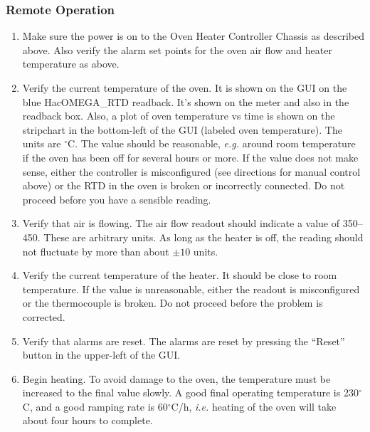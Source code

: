 {\subsubsection{Remote Operation}
\begin{enumerate}
\item Make sure the power is on to the Oven Heater Controller
Chassis as described above.  Also verify the alarm set points
for the oven air flow and heater temperature as above.  
\item Verify the current temperature of the oven.  It is shown
on the GUI on the blue HacOMEGA\_RTD readback.  It's shown on 
the meter and also in the readback box.  Also, a plot of oven temperature
vs time is shown on the stripchart in the bottom-left of the GUI 
(labeled oven temperature).  The units are $^\circ$C. 
The value should be reasonable,  {\it e.g.}\/ around room temperature 
if the oven has been off for several hours or more. If the value 
does not make sense, either the controller is misconfigured (see 
directions for manual control above) or the RTD in the oven is 
broken or incorrectly connected.  Do not proceed before you have 
a sensible reading.
\item Verify that air is flowing. The air flow readout should indicate
  a value of 350--450. These are arbitrary units. As long as the heater is
  off, the reading should not fluctuate by more than about $\pm 10$ units.
\item Verify the current temperature of the heater. It should be
  close to room temperature. If the value is unreasonable, either
  the readout is misconfigured or the thermocouple is broken.
  Do not proceed before the problem is corrected.
\item Verify that alarms are reset.  The alarms are reset by pressing
the ``Reset'' button in the upper-left of the GUI.  
\item Begin heating.  To avoid damage to the oven, the temperature 
must be increased to the final value slowly. A good final operating 
temperature is 230$^\circ$C, and a good ramping rate is 60$^\circ$C/h, 
{\it i.e.\/} heating of the oven will take about four hours to complete.


\end{enumerate}}
